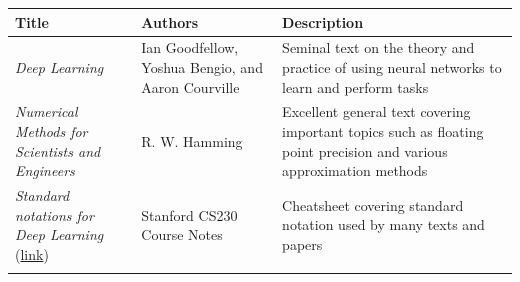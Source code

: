 \documentclass[
]{article}
\begin{document}
\begin{longtable}[]{@{}lll@{}}
\toprule
\begin{minipage}[b]{0.30\columnwidth}\raggedright
Title\strut
\end{minipage} & \begin{minipage}[b]{0.30\columnwidth}\raggedright
Authors\strut
\end{minipage} & \begin{minipage}[b]{0.30\columnwidth}\raggedright
Description\strut
\end{minipage}\tabularnewline
\midrule
\endhead
\begin{minipage}[t]{0.30\columnwidth}\raggedright
\emph{Deep Learning}\strut
\end{minipage} & \begin{minipage}[t]{0.30\columnwidth}\raggedright
Ian Goodfellow, Yoshua Bengio, and Aaron Courville\strut
\end{minipage} & \begin{minipage}[t]{0.30\columnwidth}\raggedright
Seminal text on the theory and practice of using neural networks to
learn and perform tasks\strut
\end{minipage}\tabularnewline
\begin{minipage}[t]{0.30\columnwidth}\raggedright
\emph{Numerical Methods for Scientists and Engineers}\strut
\end{minipage} & \begin{minipage}[t]{0.30\columnwidth}\raggedright
R. W. Hamming\strut
\end{minipage} & \begin{minipage}[t]{0.30\columnwidth}\raggedright
Excellent general text covering important topics such as floating point
precision and various approximation methods\strut
\end{minipage}\tabularnewline
\begin{minipage}[t]{0.30\columnwidth}\raggedright
\emph{Standard notations for Deep Learning}
(\href{https://cs230.stanford.edu/files/Notation.pdf}{link})\strut
\end{minipage} & \begin{minipage}[t]{0.30\columnwidth}\raggedright
Stanford CS230 Course Notes\strut
\end{minipage} & \begin{minipage}[t]{0.30\columnwidth}\raggedright
Cheatsheet covering standard notation used by many texts and
papers\strut
\end{minipage}\tabularnewline
\begin{minipage}[t]{0.30\columnwidth}\raggedright

\end{minipage}
\end{longtable}
\end{document}

